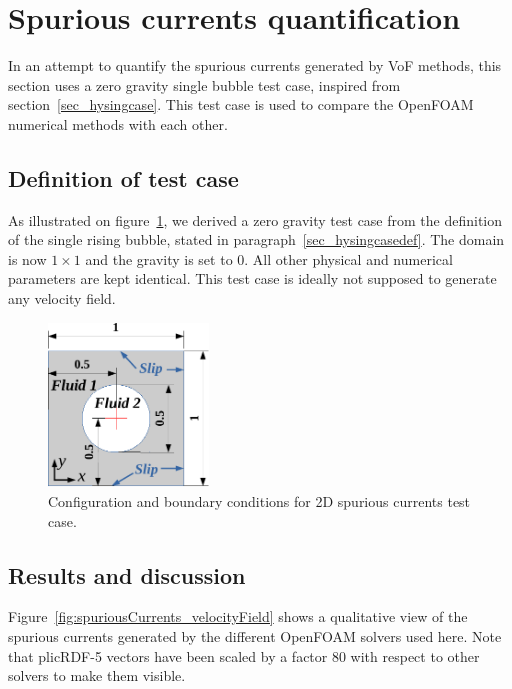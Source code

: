 \documentclass[review]{elsarticle}
\begin{document}
\clearpage
\section{Spurious currents quantification}\label{sec_spuriouscase}

In an attempt to quantify the spurious currents generated by VoF methods, this section uses a zero gravity single bubble test case, inspired from section~\ref{sec_hysingcase}. This test case is used to compare the OpenFOAM numerical methods with each other. 

\subsection{Definition of test case}\label{sec_spuriouscasedef}

As illustrated on figure~\ref{fig:spuriousCurrents_scheme}, we derived a zero gravity test case from the definition of the single rising bubble, stated in paragraph~\ref{sec_hysingcasedef}. The domain is now $1\times 1$ and the gravity is set to 0. All other physical and numerical parameters are kept identical. This test case is ideally not supposed to generate any velocity field. 

\begin{figure}[!h]
\begin{center}
 \vspace{-1mm}
 \includegraphics[width=4.25cm]{figures/spuriousCurrents_scheme.pdf}
 \vspace{-7mm}
\end{center}
\caption{Configuration and boundary conditions for 2D spurious currents test case.}
\label{fig:spuriousCurrents_scheme}
\end{figure}

\subsection{Results and discussion}\label{sec_spuriousresults}
Figure~\ref{fig:spuriousCurrents_velocityField} shows a qualitative view of the spurious currents generated by the different OpenFOAM solvers used here. Note that plicRDF-5 vectors have been scaled by a factor 80 with respect to other solvers to make them visible.
\end{document}
